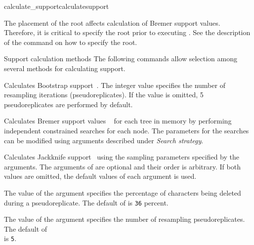 \begin{command}{calculate\_support}{calculatesupport}
\begin{statement}
    \begin{statement}
        The placement of the root affects calculation of Bremer support values.
        Therefore, it is critical to specify the root prior to executing
        . See the description of the command
         on how to specify the root.
    \end{statement}

    \begin{arguments}
        \begin{argumentgroup}{Support calculation methods}
            {The following commands allow selection among several methods for
            calculating support.} 

                {Calculates Bootstrap support~\cite{Felsenstein1985}.  The integer
                value specifies the number of resampling iterations (pseudoreplicates).
                If the value is omitted, 5 pseudoreplicates are performed by default.} 
                {}
                
                {Calculates Bremer support values ~\cite{Bremer1988, Kallersjoetal1992}
                for each tree in memory by performing independent constrained searches
                for each node. The parameters for the searches can be modified using
                arguments described under \emph{Search strategy}.} 
                {}
  
                {Calculates Jackknife support~\cite{Farrisetal1996} using the 
                sampling parameters specified by the arguments. The arguments of
                 are optional and their order is arbitrary. If
                both values are omitted, the default values of each argument is used.}
                {}
        
                          
            \begin{description}
                    {The value of the argument  specifies the
                    percentage of characters being deleted during a pseudoreplicate. The
                    default of  is \texttt{36} percent.}
                    {}

                    {The value of the argument  specifies the
                    number of resampling pseudoreplicates. The default of \\
                     is \texttt{5}.}
                    {}
            \end{description}
        \end{argumentgroup}


\end{arguments}
\end{statement}
\end{command}
